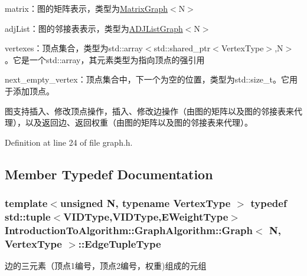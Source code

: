 \begin{DoxyItemize}
\item {\ttfamily matrix}：图的矩阵表示，类型为{\ttfamily \hyperlink{struct_introduction_to_algorithm_1_1_graph_algorithm_1_1_matrix_graph}{Matrix\+Graph}$<$N$>$}
\item {\ttfamily adj\+List}：图的邻接表表示，类型为{\ttfamily \hyperlink{struct_introduction_to_algorithm_1_1_graph_algorithm_1_1_a_d_j_list_graph}{A\+D\+J\+List\+Graph}$<$N$>$}
\item {\ttfamily vertexes}：顶点集合，类型为{\ttfamily std\+::array$<$std\+::shared\+\_\+ptr$<$Vertex\+Type$>$,N$>$}。它是一个{\ttfamily std\+::array}，其元素类型为指向顶点的强引用
\item {\ttfamily next\+\_\+empty\+\_\+vertex}：顶点集合中，下一个为空的位置，类型为{\ttfamily std\+::size\+\_\+t}。它用于添加顶点。
\end{DoxyItemize}

图支持插入、修改顶点操作，插入、修改边操作（由图的矩阵以及图的邻接表来代理），以及返回边、返回权重（由图的矩阵以及图的邻接表来代理）。 

Definition at line 24 of file graph.\+h.



\subsection{Member Typedef Documentation}
\hypertarget{struct_introduction_to_algorithm_1_1_graph_algorithm_1_1_graph_ad8741e2431522370c7221c0d5633255a}{}
\subsubsection[{Edge\+Tuple\+Type}]{\setlength{\rightskip}{0pt plus 5cm}template$<$unsigned N, typename Vertex\+Type $>$ typedef std\+::tuple$<${\bf V\+I\+D\+Type},{\bf V\+I\+D\+Type},{\bf E\+Weight\+Type}$>$ {\bf Introduction\+To\+Algorithm\+::\+Graph\+Algorithm\+::\+Graph}$<$ N, Vertex\+Type $>$\+::{\bf Edge\+Tuple\+Type}}\label{struct_introduction_to_algorithm_1_1_graph_algorithm_1_1_graph_ad8741e2431522370c7221c0d5633255a}
边的三元素（顶点1编号，顶点2编号，权重)组成的元组 

